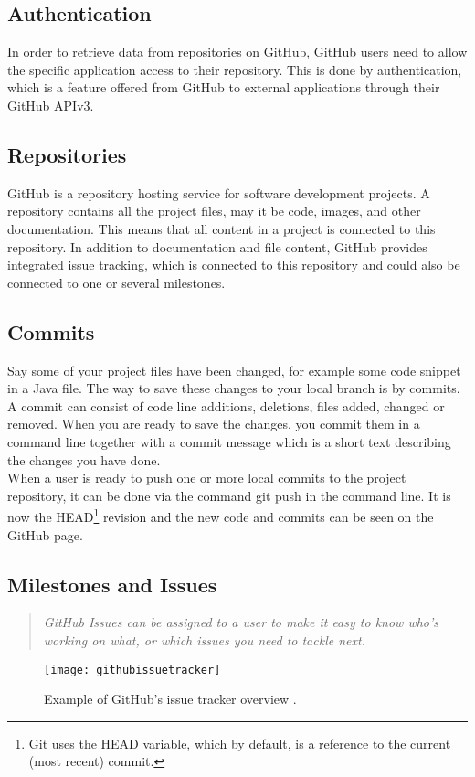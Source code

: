 \subsection{Authentication}
In order to retrieve data from repositories on GitHub, GitHub users need to allow the specific application access to their repository. This is done by authentication, which is a feature offered from GitHub to external applications through their GitHub APIv3.
\subsection{Repositories}
GitHub is a repository hosting service for software development projects. A repository contains all the project files, may it be code, images, and other documentation. This means that all content in a project is connected to this repository. In addition to documentation and file content, GitHub provides integrated issue tracking, which is connected to this repository and could also be connected to one or several milestones. 
\subsection{Commits}
Say some of your project files have been changed, for example some code snippet in a Java file. The way to save these changes to your local branch is by commits. A commit can consist of code line additions, deletions, files added, changed or removed. When you are ready to save the changes, you commit them in a command line together with a commit message which is a short text describing the changes you have done. \\
When a user is ready to push one or more local commits to the project repository, it can be done via the command git push in the command line. It is now the HEAD\footnote{Git uses the HEAD variable, which by default, is a reference to the current (most recent) commit.} revision and the new code and commits can be seen on the GitHub page.
\subsection{Milestones and Issues}
\begin{quote}
\em GitHub Issues can be assigned to a user to make it easy to know who's working on what, or which issues you need to tackle next.
\end{quote}
\begin{figure}[h!]
\centering
	\texttt{[image: githubissuetracker]}
\caption{Example of GitHub's issue tracker overview \citep{githubissuetrackerimage}.}
\label{githubissuetracker}
\end{figure}

